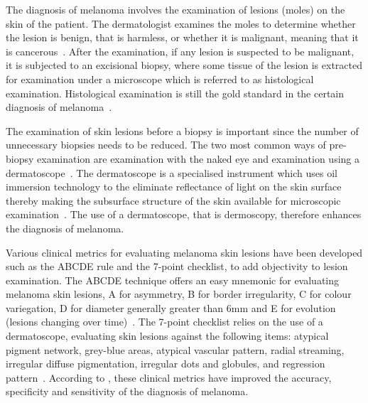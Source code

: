 \documentclass[12pt, a4paper]{article}
\begin{document}
The diagnosis of melanoma involves the examination of lesions (moles) on the skin of the patient. The dermatologist examines the moles to determine whether the lesion is benign, that is harmless, or whether it is malignant, meaning that it is cancerous~\citep{argenziano2012early}. After the examination, if any lesion is suspected to be malignant, it is subjected to an excisional biopsy, where some tissue of the lesion is extracted for examination under a microscope which is referred to as histological examination. Histological examination is still the gold standard in the certain diagnosis of melanoma~\citep{fink2017non}.

The examination of skin lesions before a biopsy is important since the number of unnecessary biopsies needs to be reduced. The two most common ways of pre-biopsy examination are examination with the naked eye and examination using a dermatoscope~\citep{rigel2005abcde}. The dermatoscope is a specialised instrument which uses oil immersion technology to the eliminate reflectance of light on the skin surface thereby making the subsurface structure of the skin available for microscopic examination~\citep{PEHAMBERGER1993S356}. The use of a dermatoscope, that is dermoscopy, therefore enhances the diagnosis of melanoma.

Various clinical metrics for evaluating melanoma skin lesions have been developed such as the ABCDE rule and the 7-point checklist, to add objectivity to lesion examination. The ABCDE technique offers an easy mnemonic for evaluating melanoma skin lesions, A for asymmetry, B for border irregularity, C for colour variegation, D for diameter generally greater than 6mm and E for evolution (lesions changing over time)~\citep{10.1001/jama.292.22.2771}. The 7-point checklist relies on the use of a dermatoscope, evaluating skin lesions against the following items: atypical pigment network, grey-blue areas, atypical vascular pattern, radial streaming, irregular diffuse pigmentation, irregular dots and globules, and regression pattern~\citep{argenziano1998epiluminescence}. According to \cite{psaty2009current}, these clinical metrics have improved the accuracy, specificity and sensitivity of the diagnosis of melanoma.
\end{document}
